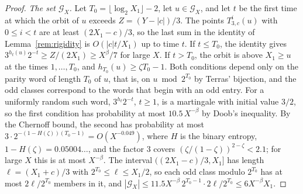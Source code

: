 \documentclass[12pt]{amsart}
\theoremstyle{definition}
\theoremstyle{remark}
\begin{document}
\begin{proof}
\emph{The set $\mathcal G_X$.} Let $T_0=\lfloor\log_2X_1\rfloor-2$, let $u\in\mathcal G_X$, and let $t$ be the first time at which the orbit of $u$ exceeds $Z=(Y-|c|)/3$. The points $T_{3,c}^i(u)$ with $0\le i<t$ are at least $(2X_1-c)/3$, so the last sum in the identity of Lemma~\ref{rem:rigidity} is $O(|c|t/X_1)$ up to time $t$. If $t\le T_0$, the identity gives $3^{h_t(u)}2^{-t}\ge Z/(2X_1)\ge X^\beta/7$ for large $X$. If $t>T_0$, the orbit is above $X_1\ge u$ at the times $1,\dots,T_0$, and $h_{T_0}(u)\ge\zeta T_0-1$. Both conditions depend only on the parity word of length $T_0$ of $u$, that is, on $u\bmod2^{T_0}$ by Terras' bijection, and the odd classes correspond to the words that begin with an odd entry. For a uniformly random such word, $3^{h_t}2^{-t}$, $t\ge1$, is a martingale with initial value $3/2$, so the first condition has probability at most $10.5\,X^{-\beta}$ by Doob's inequality. By the Chernoff bound, the second has probability at most $3\cdot2^{-(1-H(\zeta))(T_0-1)}=O(X^{-0.049})$, where $H$ is the binary entropy, $1-H(\zeta)=0.05004\ldots$, and the factor $3$ covers $(\zeta/(1-\zeta))^{2-\zeta}<2.1$; for large $X$ this is at most $X^{-\beta}$. The interval $((2X_1-c)/3,X_1]$ has length $\ell=(X_1+c)/3$ with $2^{T_0}\le\ell\le X_1/2$, so each odd class modulo $2^{T_0}$ has at most $2\ell/2^{T_0}$ members in it, and $|\mathcal G_X|\le11.5X^{-\beta}\,2^{T_0-1}\cdot2\ell/2^{T_0}\le6X^{-\beta}X_1$.


\end{proof}
\end{document}
